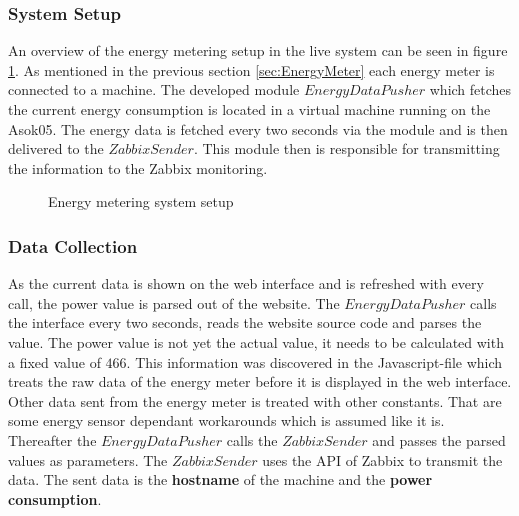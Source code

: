 {\subsubsection{System Setup}
An overview of the energy metering setup in the live system can be seen in figure \ref{fig:energyMeteringSetup}. As mentioned in the previous section \ref{sec:EnergyMeter} each energy meter is connected to a machine. The developed module $ EnergyDataPusher $ which fetches the current energy consumption is located in a virtual machine running on the Asok05. The energy data is fetched every two seconds via the module and is then delivered to the $ ZabbixSender $. This module then is responsible for transmitting the information to the Zabbix monitoring.

\begin{figure}
	\centering
	\def\svgwidth{\columnwidth}
	
	\caption{Energy metering system setup}
	\label{fig:energyMeteringSetup}
\end{figure}

\subsubsection{Data Collection}
As the current data is shown on the web interface and is refreshed with every call, the power value is parsed out of the website. The $ EnergyDataPusher $ calls the interface every two seconds, reads the website source code and parses the value. The power value is not yet the actual value, it needs to be calculated with a fixed value of $ 466 $. This information was discovered in the Javascript-file which treats the raw data of the energy meter before it is displayed in the web interface. Other data sent from the energy meter is treated with other constants. That are some energy sensor dependant workarounds which is assumed like it is. Thereafter the $ EnergyDataPusher $ calls the $ ZabbixSender $ and passes the parsed values as parameters. The $ ZabbixSender $ uses the API of Zabbix to transmit the data. The sent data is the \textbf{hostname} of the machine and the \textbf{power consumption}.

}

